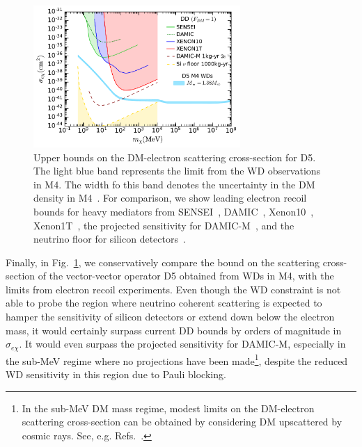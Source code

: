 \begin{figure}
    \centering
  \includegraphics[width=0.7\textwidth]{wd_capture/DD_WD_electrons_D5.pdf}
    \caption[Upper bounds on the DM-electron scattering cross-section for D5.]{Upper bounds on the DM-electron scattering cross-section for D5. The light blue band represents the limit from the WD observations in M4. The width fo this band denotes the uncertainty in the DM density in M4~\cite{McCullough:2010ai_CaptureInelasticDark}.  
     For comparison, we show leading electron recoil bounds for heavy mediators from SENSEI~\cite{SENSEI:2020dpa_SENSEIDirectdetectionresults}, DAMIC~\cite{DAMIC:2019dcn_Constraintslightdark}, Xenon10~\cite{Essig:2017kqs_Newconstraintsprospects}, Xenon1T~\cite{XENON:2019gfn_Lightdarkmatter}, the projected sensitivity for DAMIC-M~\cite{Essig:2015cda_DirectdetectionsubGeV}, and the neutrino floor for silicon detectors~\cite{Essig:2018tss_Solarneutrinossignal}. 
    }
    \label{ch4:fig:D5sigmalimit}
\end{figure}


Finally, in Fig.~\ref{ch4:fig:D5sigmalimit}, we conservatively compare the bound on the scattering cross-section of the vector-vector operator D5 obtained from WDs in M4, with the limits from electron recoil experiments. Even though the WD constraint is not able to probe the region where neutrino coherent scattering is expected to hamper the sensitivity of silicon detectors or extend down below the electron mass, it would certainly surpass current DD bounds by orders of magnitude in $\sigma_{e\chi}$. It would even surpass the projected sensitivity for DAMIC-M, especially in the sub-MeV regime where no projections have been made\footnote{In the sub-MeV DM mass regime, modest limits on the DM-electron scattering cross-section can be obtained by considering DM upscattered by cosmic rays. See, e.g. Refs.~\cite{Cappiello:2018hsu_Reversedirectdetection,Ema:2018bih_Lightdarkmatter,Dent:2020syp_oct_Presentfuturestatus}.}, despite the reduced WD sensitivity in this region due to Pauli blocking. 

